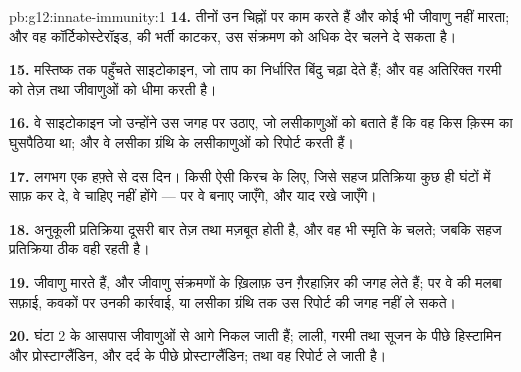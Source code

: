 \begin{solution}{pb:g12:innate-immunity:1}
\textbf{14.} तीनों उन चिह्नों पर काम करते हैं और कोई भी जीवाणु नहीं मारता;
और वह कॉर्टिकोस्टेरॉइड,  की भर्ती काटकर, उस संक्रमण को अधिक
देर चलने दे सकता है।

\textbf{15.} मस्तिष्क तक पहुँचते साइटोकाइन, जो ताप का निर्धारित बिंदु चढ़ा
देते हैं; और वह अतिरिक्त गरमी  को तेज़ तथा जीवाणुओं को धीमा
करती है।

\textbf{16.} वे साइटोकाइन जो उन्होंने उस जगह पर उठाए, जो लसीकाणुओं को बताते
हैं कि वह किस क़िस्म का घुसपैठिया था; और वे लसीका ग्रंथि के लसीकाणुओं को
रिपोर्ट करती हैं।

\textbf{17.} लगभग एक हफ़्ते से दस दिन। किसी ऐसी किरच के लिए, जिसे सहज
प्रतिक्रिया कुछ ही घंटों में साफ़ कर दे, वे चाहिए नहीं होंगे --- पर वे बनाए
जाएँगे, और याद रखे जाएँगे।

\textbf{18.} अनुकूली प्रतिक्रिया दूसरी बार तेज़ तथा मज़बूत होती है, और वह भी
स्मृति के चलते; जबकि सहज प्रतिक्रिया ठीक वही रहती है।

\textbf{19.}  जीवाणु मारते हैं, और जीवाणु संक्रमणों के ख़िलाफ़ उन
ग़ैरहाज़िर  की जगह लेते हैं; पर वे  की मलबा
सफ़ाई, कवकों पर उनकी कार्रवाई, या लसीका ग्रंथि तक उस रिपोर्ट की जगह नहीं ले
सकते।

\textbf{20.} घंटा 2 के आसपास  जीवाणुओं से आगे निकल जाती हैं;
लाली, गरमी तथा सूजन के पीछे हिस्टामिन और प्रोस्टाग्लैंडिन, और दर्द के पीछे
प्रोस्टाग्लैंडिन; तथा वह रिपोर्ट  ले जाती है।
\end{solution}
